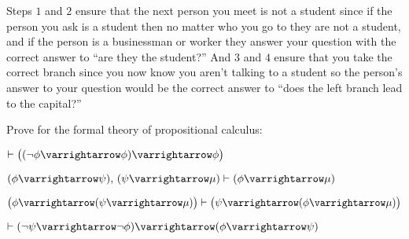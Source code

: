 \documentclass[10pt]{article}
\let\to=\varrightarrow
\begin{document}
\begin{blankpp}
    Steps $1$ and $2$ ensure that the next person you meet is not a student since if the person you ask is a student then no matter who you go to they are not a student, and if the person is a businessman
    or worker they answer your question with the correct answer to ``are they the student?''
    And $3$ and $4$ ensure that you take the correct branch since you now know you aren't talking to a student so the person's answer to your question would be the correct answer to ``does the left branch
    lead to the capital?''

\end{blankpp}

\begin{exercise*}

    Prove for the formal theory of propositional calculus:
    \benum
        \item $\vdash\bigl((\neg\phi\to\phi)\to\phi\bigr)$
        \item $(\phi\to\psi),\,(\psi\to\mu)\vdash(\phi\to\mu)$
        \item $\bigl(\phi\to(\psi\to\mu)\bigr)\vdash\bigl(\psi\to(\phi\to\mu)\bigr)$
        \item $\vdash(\neg\psi\to\neg\phi)\to(\phi\to\psi)$
    \eenum

\end{exercise*}
\end{document}

